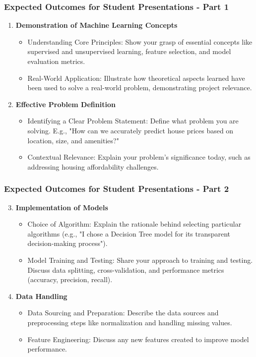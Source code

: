 \documentclass[aspectratio=169]{beamer}
\begin{document}
\begin{frame}[fragile]
    \frametitle{Expected Outcomes for Student Presentations - Part 1}
    \begin{enumerate}
        \item \textbf{Demonstration of Machine Learning Concepts}
        \begin{itemize}
            \item Understanding Core Principles: Show your grasp of essential concepts like supervised and unsupervised learning, feature selection, and model evaluation metrics.
            \item Real-World Application: Illustrate how theoretical aspects learned have been used to solve a real-world problem, demonstrating project relevance.
        \end{itemize}

        \item \textbf{Effective Problem Definition}
        \begin{itemize}
            \item Identifying a Clear Problem Statement: Define what problem you are solving. E.g., "How can we accurately predict house prices based on location, size, and amenities?"
            \item Contextual Relevance: Explain your problem's significance today, such as addressing housing affordability challenges.
        \end{itemize}
    \end{enumerate}
\end{frame}

\begin{frame}[fragile]
    \frametitle{Expected Outcomes for Student Presentations - Part 2}
    \begin{enumerate}
        \setcounter{enumi}{2}  %
        \item \textbf{Implementation of Models}
        \begin{itemize}
            \item Choice of Algorithm: Explain the rationale behind selecting particular algorithms (e.g., "I chose a Decision Tree model for its transparent decision-making process").
            \item Model Training and Testing: Share your approach to training and testing. Discuss data splitting, cross-validation, and performance metrics (accuracy, precision, recall).
        \end{itemize}

        \item \textbf{Data Handling}
        \begin{itemize}
            \item Data Sourcing and Preparation: Describe the data sources and preprocessing steps like normalization and handling missing values.
            \item Feature Engineering: Discuss any new features created to improve model performance.
        \end{itemize}
    \end{enumerate}
\end{frame}
\end{document}
